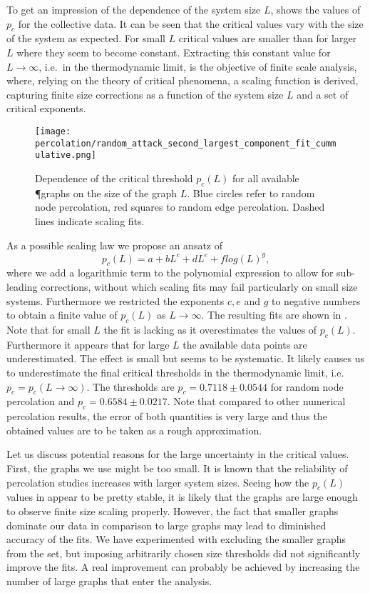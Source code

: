 		To get an impression of the dependence of the system size $L$,  shows the values of $p_c$ for the collective data. It can be seen that the critical values vary with the size of the system as expected. For small $L$ critical values are smaller than for larger $L$ where they seem to become constant. Extracting this constant value for $L \to \infty$, i.e.\ in the thermodynamic limit, is the objective of finite scale analysis, where, relying on the theory of critical phenomena, a scaling function is derived, capturing finite size corrections as a function of the system size $L$ and a set of critical exponents. 
		
		\begin{figure}[!htbp]
			\centering
				\texttt{[image: percolation/random\_attack\_second\_largest\_component\_fit\_cummulative.png]}
			\caption[Critical percolation thresholds.]{Dependence of the critical threshold $p_c(L)$ for all available \P graphs on the size of the graph $L$. Blue circles refer to random node percolation, red squares to random edge percolation. Dashed lines indicate scaling fits.}
			\label{fig:percolation_scaling}
		\end{figure}

		As a possible scaling law we propose an ansatz of
		\begin{equation}
			p_c(L) = a + b L^{c} + d L^{e} + f log(L)^{g},
		\end{equation}
		where we add a logarithmic term to the polynomial expression to allow for sub-leading corrections, without which scaling fits may fail particularly on small size systems. Furthermore we restricted the exponents $c,e$ and $g$ to negative numbers to obtain a finite value of $p_c(L)$ as $L \to \infty$. The resulting fits are shown in . Note that for small $L$ the fit is lacking as it overestimates the values of $p_c(L)$.  Furthermore it appears that for large $L$ the available data points are underestimated. The effect is small but seems to be systematic. It likely causes us to underestimate the final critical thresholds in the thermodynamic limit, i.e.\ $ p_c = p_c(L \to \infty)$. The thresholds are $p_c = 0.7118 \pm 0.0544$ for random node percolation and $p_c = 0.6584 \pm 0.0217$. Note that compared to other numerical percolation results, the error of both quantities is very large and thus the obtained values are to be taken as a rough approximation.

		Let us discuss potential reasons for the large uncertainty in the critical values. First, the graphs we use might be too small. It is known that the reliability of percolation studies increases with larger system sizes. Seeing how the $p_c(L)$ values in  appear to be pretty stable, it is likely that the graphs are large enough to observe finite size scaling properly. However, the fact that smaller graphs dominate our data in comparison to large graphs may lead to diminished accuracy of the fits. We have experimented with excluding the smaller graphs from the set, but imposing arbitrarily chosen size thresholds did not significantly improve the fits. A real improvement can probably be achieved by increasing the number of large graphs that enter the analysis.

